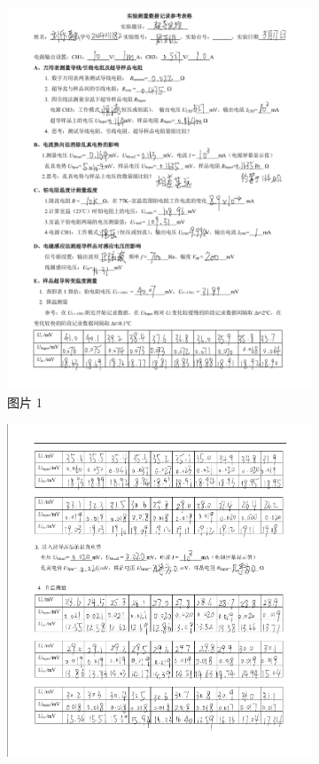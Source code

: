 \documentclass{THUexprep}
\begin{document}
\begin{figure}[H]
    \centering
    \begin{subfigure}{0.45\textwidth}
        \centering
        \includegraphics[width=\textwidth]{1.png}
        \caption{图片 1}
    \end{subfigure}
    \begin{subfigure}{0.45\textwidth}
        \centering
        \includegraphics[width=\textwidth]{2.png}

\end{subfigure}
\end{figure}
\end{document}
